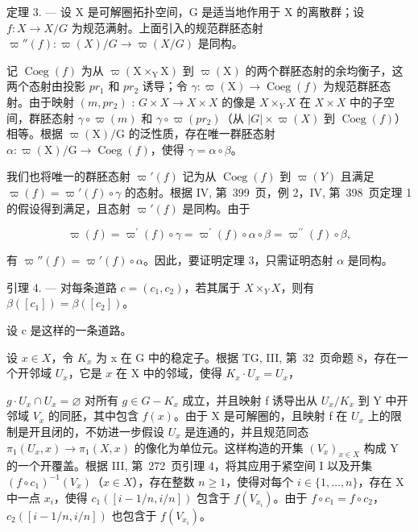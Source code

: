 定理 3. --- 设 X 是可解圈拓扑空间，G 是适当地作用于 X 的离散群；设 \(f\colon X \to X/G\) 为规范满射。上面引入的规范群胚态射 \(\varpi''(f)\colon \varpi(X)/G \to \varpi(X/G)\) 是同构。

记 \(\operatorname{Coeg}(f)\) 为从 \(\varpi(\mathrm{X} \times_{\mathrm{Y}} \mathrm{X})\) 到 \(\varpi(\mathrm{X})\) 的两个群胚态射的余均衡子，这两个态射由投影 \(pr_{1}\) 和 \(pr_{2}\) 诱导；令 \(\gamma: \varpi(\mathrm{X}) \to \operatorname{Coeg}(f)\) 为规范群胚态射。由于映射 \((m, pr_{2})\) : \(G \times X \to X \times X\) 的像是 \(X \times_{Y} X\) 在 \(X \times X\) 中的子空间，群胚态射 \(\gamma \circ \varpi(m)\) 和 \(\gamma \circ \varpi(pr_{2})\)（从 \(\lvert G\rvert \times \varpi(X)\) 到 \(\operatorname{Coeg}(f)\)）相等。根据 \(\varpi(\mathrm{X})/\mathrm{G}\) 的泛性质，存在唯一群胚态射 \(\alpha: \varpi(\mathrm{X})/\mathrm{G} \to \operatorname{Coeg}(f)\)，使得 \(\gamma = \alpha \circ \beta\)。

我们也将唯一的群胚态射 \(\varpi'(f)\) 记为从 \(\operatorname{Coeg}(f)\) 到 \(\varpi(Y)\) 且满足 \(\varpi(f) = \varpi'(f) \circ \gamma\) 的态射。根据 IV, 第~399~页，例 2，IV, 第~398~页定理 1 的假设得到满足，且态射 \(\varpi'(f)\) 是同构。由于

\[
\varpi (f) = \varpi^ {\prime} (f) \circ \gamma = \varpi^ {\prime} (f) \circ \alpha \circ \beta = \varpi^ {\prime \prime} (f) \circ \beta ,
\]

有 \(\varpi''(f) = \varpi'(f) \circ \alpha\)。因此，要证明定理 3，只需证明态射 \(\alpha\) 是同构。

引理 4. --- 对每条道路 \(c = (c_1, c_2)\)，若其属于 \(X \times_Y X\)，则有 \(\beta([c_1]) = \beta([c_2])\)。

设 c 是这样的一条道路。

设 \(x \in X\)，令 \(K_x\) 为 x 在 G 中的稳定子。根据 TG, III, 第~32~页命题 8，存在一个开邻域 \(U_x\)，它是 \(x\) 在 X 中的邻域，使得 \(K_x \cdot U_x = U_x\)，

\(g \cdot U_x \cap U_x = \varnothing\) 对所有 \(g \in G - K_x\) 成立，并且映射 f 诱导出从 \(U_x/K_x\) 到 Y 中开邻域 \(V_x\) 的同胚，其中包含 \(f(x)\)。由于 X 是可解圈的，且映射 f 在 \(U_x\) 上的限制是开且闭的，不妨进一步假设 \(U_x\) 是连通的，并且规范同态 \(\pi_1(U_x, x) \to \pi_1(X, x)\) 的像化为单位元。这样构造的开集 \((V_x)_{x \in X}\) 构成 Y 的一个开覆盖。根据 III, 第~272~页引理 4，将其应用于紧空间 I 以及开集 \((f \circ c_1)^{-1}(V_x)\)（\(x \in X\)），存在整数 \(n \geqslant 1\)，使得对每个 \(i \in \{1, \ldots, n\}\)，存在 X 中一点 \(x_i\)，使得 \(c_1([i-1/n, i/n])\) 包含于 \(f(V_{x_i})\)。由于 \(f \circ c_1 = f \circ c_2\)，\(c_2([i-1/n, i/n])\) 也包含于 \(f(V_{x_i})\)。

